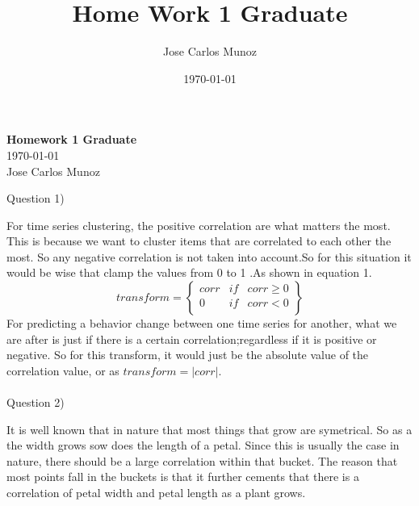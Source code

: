 \documentclass[12pt,english]{article}
\title{Home Work 1 Graduate}
\date{\today}
\author{Jose Carlos Munoz}
\begin{document}
\begin{center}
    \Large
    \textbf{Homework 1 Graduate}\\
    \small
    \today\\
    \large
    Jose Carlos Munoz
\end{center}
Question 1)\par
For time series clustering, the positive correlation are what matters the most. This is because we want to cluster items that are correlated to each other the most. So any negative correlation is not taken into account.So for this situation it would be wise that clamp the values from 0 to 1 .As shown in equation 1.
\begin{equation}
transform =
\begin{Bmatrix} corr &if &corr \geq 0  \\  0     & if & corr < 0  \\  \end{Bmatrix}
\end{equation}
For predicting a behavior change between one time series for another, what we are after is just if there is a certain correlation;regardless if it is positive or negative. So for this transform, it would just be the absolute value of the correlation value, or as $transform =|corr|$.
\\
\\
Question 2)\par
It is well known that in nature that most things that grow are symetrical. So as a the width grows sow does the length of a petal. Since this is usually the case in nature, there should be a large correlation within that bucket. The reason that most points fall in the buckets is that it further cements that there is a correlation of petal width and petal length as a plant grows.
\end{document}
